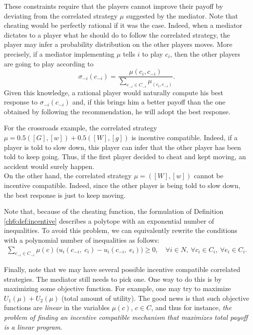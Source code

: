 These constraints require that the players cannot improve their payoff by deviating from the correlated strategy $\mu$ suggested by the mediator. Note that cheating would be perfectly rational if it was the case.
Indeed, when a mediator dictates to a player what he should do to follow the correlated strategy, the player may infer a probability distribution on the other players moves. 
More precisely, if a mediator implementing $\mu$ tells $i$ to play $c_i$, then the other players are going to play according to
$$ \sigma_{-i}(c_{-i}) = \frac{\mu(c_{i}, c_{-i})}{ \sum_{e_{-i} \in C_{-i}} \mu_(c_i, e_{-i})}.$$
Given this knowledge, a rational player would naturally compute his best response to $\sigma_{-i}(c_{-i})$ and, if this brings him a better payoff than the one obtained by following the recommendation, he will adopt the best response.

\begin{example}
For the crossroads example, the correlated strategy $\mu = 0.5([G], [w]) + 0.5 ([W],[g])$ is incentive compatible. 
Indeed, if a player is told to slow down, this player can infer that the other player has been told to keep going. Thus, if the first player decided to cheat and kept moving, an accident would surely happen.\\
On the other hand, the correlated strategy $\mu = ([W],[w])$ cannot be incentive compatible. Indeed, since the other player is being told to slow down, the best response is just to keep moving.
\end{example}

 Note that, because of the cheating function, the  formulation of Definition \ref{ch6:def:incentive} describes a polytope with an exponential number of inequalities. To avoid this problem, we can equivalently rewrite the conditions with a polynomial number of inequalities as follows:
\begin{align*}
	\sum_{c_{-i} \in C_{-i}} \mu(c) \, \big( u_i(c_{-i}, \; c_i) - u_i(c_{-i}, \; e_i) \big) \geq 0, \quad \forall i \in N, \ \forall c_i \in C_i, \ \forall e_i \in C_i.
\end{align*}

Finally, note that we may have several possible incentive compatible correlated strategies. The mediator still needs to pick one. 
One way to do this is by maximizing some objective function. For example, 
one may try to maximize $U_1(\mu) + U_2(\mu)$ (total amount of utility). The good news is that such objective functions are \emph{linear} in the variables $\mu(c)$, $c \in C$, and thus for instance, \emph{the problem of finding an incentive compatible mechanism that maximizes total payoff is a linear program}. 

